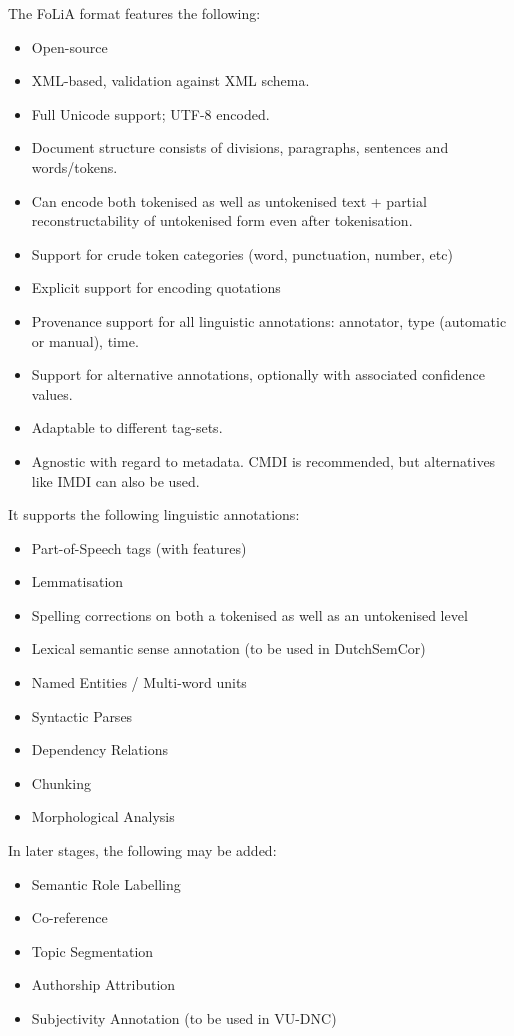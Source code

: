 \documentclass[a4paper,12pt]{report}
\begin{document}
The FoLiA format features the following:

\begin{itemize}
\item Open-source
\item XML-based, validation against XML schema.
\item Full Unicode support; UTF-8 encoded.
\item Document structure consists of divisions, paragraphs, sentences and words/tokens.
\item Can encode both tokenised as well as untokenised text + partial reconstructability of untokenised form even after tokenisation.
\item Support for crude token categories (word, punctuation, number, etc)
\item Explicit support for encoding quotations
\item Provenance support for all linguistic annotations: annotator, type (automatic or manual), time.
\item Support for alternative annotations, optionally with associated confidence values.
\item Adaptable to different tag-sets.
\item Agnostic with regard to metadata. CMDI is recommended, but alternatives like IMDI can also be used.
\end{itemize}

It supports the following linguistic annotations:

\begin{itemize}
\item Part-of-Speech tags (with features)
\item Lemmatisation
\item Spelling corrections on both a tokenised as well as an untokenised level
\item Lexical semantic sense annotation (to be used in DutchSemCor)
\item Named Entities / Multi-word units
\item Syntactic Parses
\item Dependency Relations
\item Chunking
\item Morphological Analysis

\end{itemize}

In later stages, the following may be added:

\begin{itemize}
\item Semantic Role Labelling
\item Co-reference
\item Topic Segmentation
\item Authorship Attribution
\item Subjectivity Annotation (to be used in VU-DNC)
\end{itemize}
\end{document}
